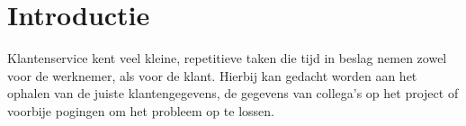 
\section{Introductie}%
\label{sec:introductie}






Klantenservice kent veel kleine, repetitieve taken die tijd in beslag nemen zowel voor de werknemer, als voor de klant. Hierbij kan gedacht worden aan het ophalen van de juiste klantengegevens, de gegevens van collega's op het project of voorbije pogingen om het probleem op te lossen. 


